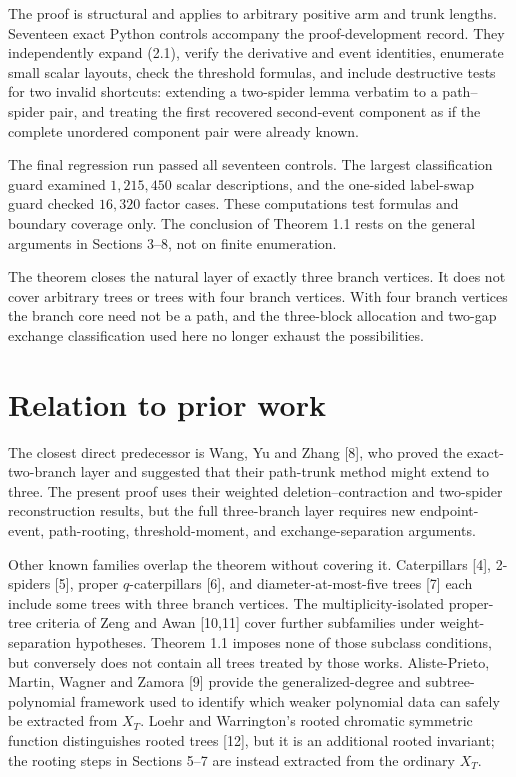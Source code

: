 \documentclass[11pt]{article}
\begin{document}
The proof is structural and applies to arbitrary positive arm and trunk lengths. Seventeen exact
Python controls accompany the proof-development record. They independently expand (2.1), verify
the derivative and event identities, enumerate small scalar layouts, check the threshold formulas,
and include destructive tests for two invalid shortcuts: extending a two-spider lemma verbatim to a
path--spider pair, and treating the first recovered second-event component as if the complete
unordered component pair were already known.

The final regression run passed all seventeen controls. The largest classification guard examined
$1,215,450$ scalar descriptions, and the one-sided label-swap guard checked $16,320$ factor cases.
These computations test formulas and boundary coverage only. The conclusion of Theorem 1.1 rests on
the general arguments in Sections 3--8, not on finite enumeration.

The theorem closes the natural layer of exactly three branch vertices. It does not cover arbitrary
trees or trees with four branch vertices. With four branch vertices the branch core need not be a
path, and the three-block allocation and two-gap exchange classification used here no longer
exhaust the possibilities.

\section{Relation to prior work}


The closest direct predecessor is Wang, Yu and Zhang [8], who proved the exact-two-branch layer and
suggested that their path-trunk method might extend to three. The present proof uses their weighted
deletion--contraction and two-spider reconstruction results, but the full three-branch layer requires
new endpoint-event, path-rooting, threshold-moment, and exchange-separation arguments.

Other known families overlap the theorem without covering it. Caterpillars [4], 2-spiders [5],
proper $q$-caterpillars [6], and diameter-at-most-five trees [7] each include some trees with three
branch vertices. The multiplicity-isolated proper-tree criteria of Zeng and Awan [10,11] cover
further subfamilies under weight-separation hypotheses. Theorem 1.1 imposes none of those subclass
conditions, but conversely does not contain all trees treated by those works. Aliste-Prieto, Martin,
Wagner and Zamora [9] provide the generalized-degree and subtree-polynomial framework used to
identify which weaker polynomial data can safely be extracted from $X_T$. Loehr and Warrington's
rooted chromatic symmetric function distinguishes rooted trees [12], but it is an additional rooted
invariant; the rooting steps in Sections 5--7 are instead extracted from the ordinary $X_T$.
\end{document}
